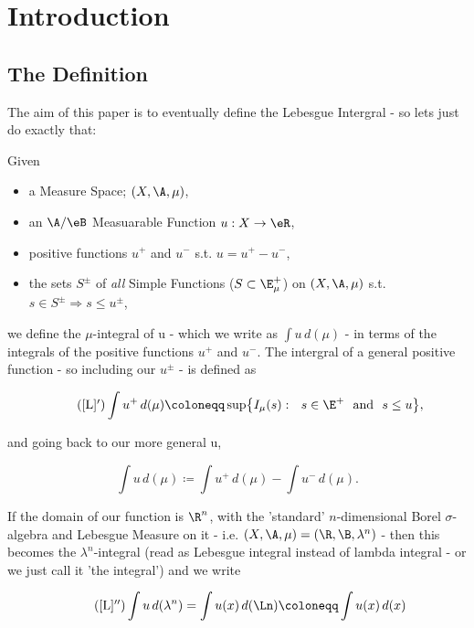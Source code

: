 \section{Introduction} \label{intro}
\subsection{The Definition} \label{def}

The aim of this paper is to eventually define the Lebesgue Intergral - so lets just do exactly that:
\begin{definition}
	Given
	\begin{itemize}
		\item a Measure Space; $(X, \A, \mu)$,
		\item an $\A/\eB$ Measuarable Function $u : X \rightarrow \eR$,
		\item positive functions $u^+$ and $u^-$ s.t. $u = u^+ - u^-$,
		\item the sets $S^{\pm}$ of {\em all} Simple Functions ($S \subset \E_\mu^+$) on $(X, \A, \mu)$ s.t. $s \in S^{\pm} \Rightarrow s \leq u^{\pm}$,
	\end{itemize}

	we define the $\mu$-integral of u - which we write as $\int u\,d(\mu)$ - in terms of the integrals of the positive functions $u^+$ and 			$u^-$. The intergral of a general positive function - so including our $u^{\pm}$ - is defined as

	\begin{equation*}\label{posint}\tag{\ref{L}$'$}
	\int u^+\,d(\mu) \coloneqq \sup\bigr\{ I_\mu(s) : \ \  s \in \E^+ \hbox{ \ and \ } s \le u \bigl\},
	\end{equation*}

	and going back to our more general u, 

	\begin{equation}\label{L}
	\int u\,d(\mu) \coloneqq \int u^+\,d(\mu) - \int u^-\,d(\mu).
	\end{equation}

	If the domain of our function is $\R^n$, with the 'standard' $n$-dimensional Borel $\sigma$-algebra and Lebesgue Measure on it - i.e. $(X, \A, \mu) 	= (\R, \B, \lambda^n)$ - then this becomes the $\lambda^n$-integral (read as Lebesgue integral instead of lambda integral - or we just 			call it 'the integral') and we write

	\begin{equation*} \tag{\ref{L}$''$}
	\int u\,d(\lambda^n) =  \int u(x)\,d(\Ln) \coloneqq \int u(x)\,d(x) 
	\end{equation*}
\end{definition}

